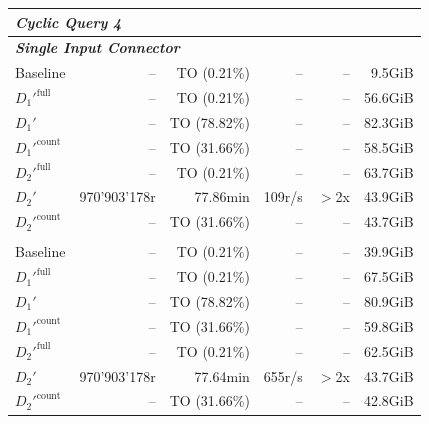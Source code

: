 \begin{longtable}{lrrrrr}
    \multicolumn{6}{l}{\textit{Cyclic Query 4}} \\
    \midrule
    \multicolumn{6}{l}{\textit{\textbf{Single Input Connector}}} \\
    \nopagebreak
    Baseline              &  --                   &  TO (0.21\%)        &  --                  & --                & 9.5GiB    \\
    $D_1'^{\text{full}}$   &  --                   &  TO (0.21\%)        &  --                  & --                & 56.6GiB   \\
    \quad $D_1'$           &  --                   &  TO (78.82\%)      &  --                  & --                & 82.3GiB   \\
    $D_1'^{\text{count}}$   &  --                   &  TO (31.66\%)       &  --                  & --                & 58.5GiB   \\
    $D_2'^{\text{full}}$   &  --                   &  TO (0.21\%)       &  --                  & --                & 63.7GiB   \\
    \quad $D_2'$           &  970'903'178r         &  77.86min         &  109r/s                 & $>$2x             & 43.9GiB   \\
    $D_2'^{\text{count}}$  &  --                   &  TO (31.66\%)       &  --                   & --                & 43.7GiB   \\
    \addlinespace 
    
    \multicolumn{6}{l}{\textit{\textbf{6 Input Connectors}}} \\
    \nopagebreak
    Baseline               &  --                   &  TO (0.21\%)        &  --                  & --                & 39.9GiB   \\
    $D_1'^{\text{full}}$   &  --                   & TO (0.21\%)        &  --                  & --                & 67.5GiB   \\
    \quad $D_1'$           &  --                   & TO (78.82\%)          &  --                  & --              & 80.9GiB    \\
    $D_1'^{\text{count}}$  &  --                   &  TO (31.66\%)       &  --                  & --                & 59.8GiB   \\
    $D_2'^{\text{full}}$   &  --                   &  TO (0.21\%)        &  --                  & --                & 62.5GiB   \\
    \quad $D_2'$           &  970'903'178r         & 77.64min             &  655r/s                & $>$2x             & 43.7GiB   \\
    $D_2'^{\text{count}}$  &  --                   &  TO (31.66\%)       &  --                    & --               & 42.8GiB  \\
    \midrule
    

\end{longtable}
